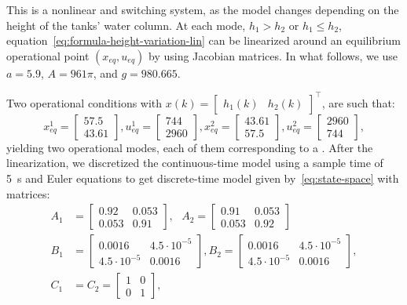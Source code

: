 This is a nonlinear and switching system, as the model changes depending on the
height of the tanks' water column. At each mode, \(h_1>h_2\) or \(h_1\leq h_2\),
equation~\eqref{eq:formula-height-variation-lin} can be linearized around an
equilibrium operational point \((x_{eq},u_{eq})\) by using Jacobian matrices. In
what follows, we use \(a=5.9\), \(A=961\pi{}\), and \(g=980.665\).

Two operational conditions with
\(x(k) = \begin{bmatrix}h_1(k) & h_2(k)\end{bmatrix}^\top{}\), are such that:
%
\begin{equation*}
  x_{eq}^1 =\! \begin{bmatrix}
    57.5 \\ 43.61
  \end{bmatrix}\!,
  u_{eq}^1 =\! \begin{bmatrix}
    744 \\ 2960
  \end{bmatrix}\!,
  x_{eq}^2 = \begin{bmatrix}
    43.61 \\ 57.5
  \end{bmatrix}\!,
  u_{eq}^2 =\! \begin{bmatrix}
    2960 \\ 744
  \end{bmatrix}\!,
\end{equation*}
%
yielding two operational modes, each of them corresponding to a \CG{}.\@
%
After the linearization, we discretized the continuous-time model using a sample
time of \SI{5}{\second} and Euler equations to get discrete-time model given
by~\eqref{eq:state-space} with matrices:
%
\begin{align*}
  A_1 & =
  \begin{bmatrix}
    0.92  & 0.053 \\
    0.053 & 0.91
  \end{bmatrix}, ~~~ A_2 = \begin{bmatrix}
    0.91  & 0.053 \\
    0.053 & 0.92
  \end{bmatrix} \\
  B_1 & =
  \begin{bmatrix}
    0.0016          & 4.5\cdot10^{-5} \\
    4.5\cdot10^{-5} & 0.0016
  \end{bmatrix},
  B_2 = \begin{bmatrix}
    0.0016          & 4.5\cdot10^{-5} \\
    4.5\cdot10^{-5} & 0.0016
  \end{bmatrix},                              \\
  C_1 & = C_2 =
  \begin{bmatrix}
    1 & 0 \\
    0 & 1
  \end{bmatrix},
\end{align*}
